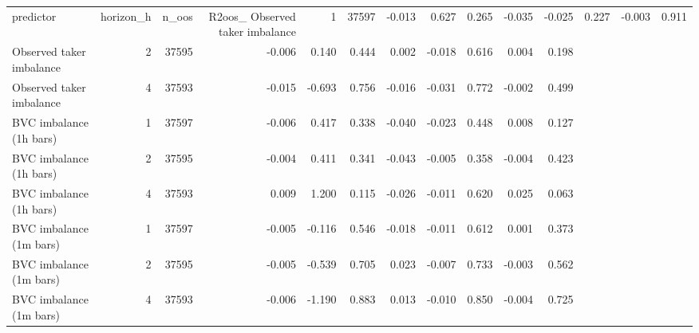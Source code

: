 \begin{tabular}{lrrrrrrrrrr}
\toprule
predictor & horizon_h & n_oos & R2oos_%
\midrule
Observed taker imbalance & 1 & 37597 & -0.013 & 0.627 & 0.265 & -0.035 & -0.025 & 0.227 & -0.003 & 0.911 \\
Observed taker imbalance & 2 & 37595 & -0.006 & 0.140 & 0.444 & 0.002 & -0.018 & 0.616 & 0.004 & 0.198 \\
Observed taker imbalance & 4 & 37593 & -0.015 & -0.693 & 0.756 & -0.016 & -0.031 & 0.772 & -0.002 & 0.499 \\
BVC imbalance (1h bars) & 1 & 37597 & -0.006 & 0.417 & 0.338 & -0.040 & -0.023 & 0.448 & 0.008 & 0.127 \\
BVC imbalance (1h bars) & 2 & 37595 & -0.004 & 0.411 & 0.341 & -0.043 & -0.005 & 0.358 & -0.004 & 0.423 \\
BVC imbalance (1h bars) & 4 & 37593 & 0.009 & 1.200 & 0.115 & -0.026 & -0.011 & 0.620 & 0.025 & 0.063 \\
BVC imbalance (1m bars) & 1 & 37597 & -0.005 & -0.116 & 0.546 & -0.018 & -0.011 & 0.612 & 0.001 & 0.373 \\
BVC imbalance (1m bars) & 2 & 37595 & -0.005 & -0.539 & 0.705 & 0.023 & -0.007 & 0.733 & -0.003 & 0.562 \\
BVC imbalance (1m bars) & 4 & 37593 & -0.006 & -1.190 & 0.883 & 0.013 & -0.010 & 0.850 & -0.004 & 0.725 \\
\bottomrule
\end{tabular}
